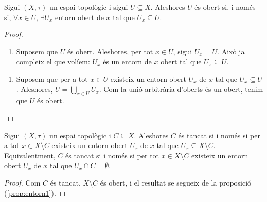\documentclass[../main.tex]{subfiles}
\begin{document}
\begin{prop}
\label{prop:entorn1} Sigui $(X,\tau)$ un espai topològic i sigui $U\subseteq X$. Aleshores $U$ és obert si, i només si, $\forall x\in U$, $\exists U_x$ entorn obert de $x$ tal que $U_x\subseteq U$.
\end{prop}
\begin{proof}
\begin{enumerate}[($\Rightarrow$)]
    \item Suposem que $U$ és obert. Aleshores, per tot $x\in U$, sigui $U_x = U$. Això ja compleix el que volíem: $U_x$ és un entorn de $x$ obert tal que $U_x\subseteq U$.
\end{enumerate}
\begin{enumerate}[($\Leftarrow$)]
    \item Suposem que per a tot $x\in U$ existeix un entorn obert $U_x$ de $x$ tal que $U_x\subseteq U$. Aleshores, $U = \bigcup_{x\in U}U_x$. Com la unió arbitrària d'oberts és un obert, tenim que $U$ és obert.
\end{enumerate}
\end{proof}

\begin{prop}
\label{prop:entorn2} Sigui $(X,\tau)$ un espai topològic i $C\subseteq X$. Aleshores $C$ és tancat si i només si per a tot $x\in X\setminus C$ existeix un entorn obert $U_x$ de $x$ tal que $U_x\subseteq X\setminus C$. Equivalentment, $C$ és tancat si i només si per tot $x\in X\setminus C$ existeix un entorn obert $U_x$ de $x$ tal que $U_x\cap C = \emptyset$.
\end{prop}
\begin{proof}
Com $C$ és tancat, $X\setminus C$ és obert, i el resultat se segueix de la proposició (\ref{prop:entorn1}).
\end{proof}
\end{document}
